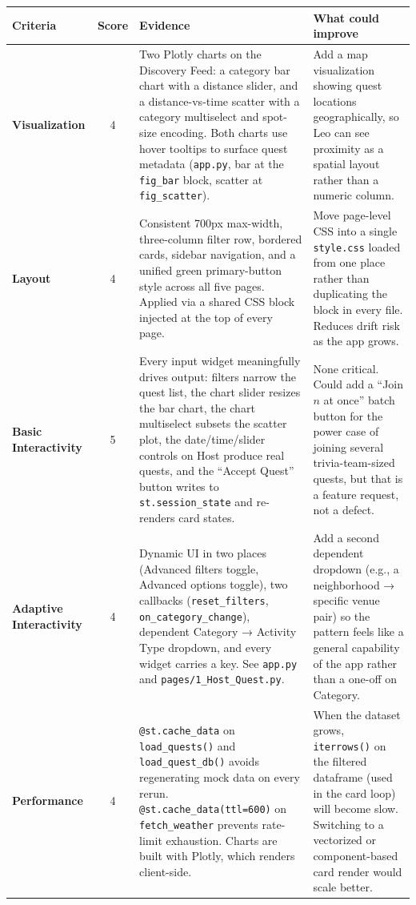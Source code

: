 \documentclass[11pt]{article}
\begin{document}
\begin{table}[h!]
\centering
\begin{tabularx}{\textwidth}{>{\bfseries}l c X X}
\toprule
Criteria & Score & Evidence & What could improve \\
\midrule
Visualization & 4 & Two Plotly charts on the Discovery Feed: a category bar chart with a distance slider, and a distance-vs-time scatter with a category multiselect and spot-size encoding. Both charts use hover tooltips to surface quest metadata (\texttt{app.py}, bar at the \texttt{fig\_bar} block, scatter at \texttt{fig\_scatter}). & Add a map visualization showing quest locations geographically, so Leo can see proximity as a spatial layout rather than a numeric column. \\
\addlinespace
Layout & 4 & Consistent 700px max-width, three-column filter row, bordered cards, sidebar navigation, and a unified green primary-button style across all five pages. Applied via a shared CSS block injected at the top of every page. & Move page-level CSS into a single \texttt{style.css} loaded from one place rather than duplicating the block in every file. Reduces drift risk as the app grows. \\
\addlinespace
Basic Interactivity & 5 & Every input widget meaningfully drives output: filters narrow the quest list, the chart slider resizes the bar chart, the chart multiselect subsets the scatter plot, the date/time/slider controls on Host produce real quests, and the ``Accept Quest'' button writes to \texttt{st.session\_state} and re-renders card states. & None critical. Could add a ``Join $n$ at once'' batch button for the power case of joining several trivia-team-sized quests, but that is a feature request, not a defect. \\
\addlinespace
Adaptive Interactivity & 4 & Dynamic UI in two places (Advanced filters toggle, Advanced options toggle), two callbacks (\texttt{reset\_filters}, \texttt{on\_category\_change}), dependent Category → Activity Type dropdown, and every widget carries a key. See \texttt{app.py} and \texttt{pages/1\_Host\_Quest.py}. & Add a second dependent dropdown (e.g., a neighborhood → specific venue pair) so the pattern feels like a general capability of the app rather than a one-off on Category. \\
\addlinespace
Performance & 4 & \texttt{@st.cache\_data} on \texttt{load\_quests()} and \texttt{load\_quest\_db()} avoids regenerating mock data on every rerun. \texttt{@st.cache\_data(ttl=600)} on \texttt{fetch\_weather} prevents rate-limit exhaustion. Charts are built with Plotly, which renders client-side. & When the dataset grows, \texttt{iterrows()} on the filtered dataframe (used in the card loop) will become slow. Switching to a vectorized or component-based card render would scale better. \\

\end{tabularx}
\end{table}
\end{document}
